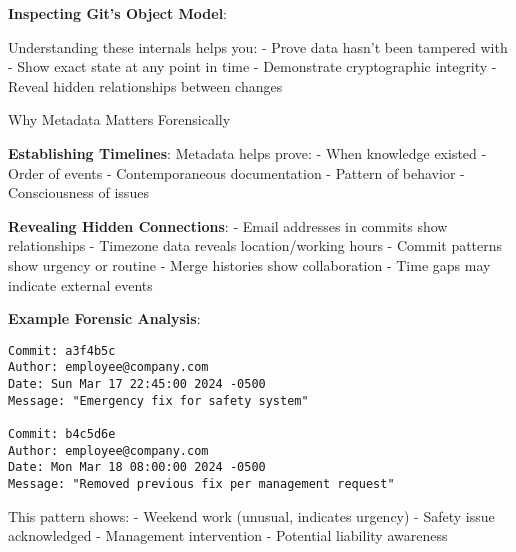 \textbf{Inspecting Git's Object Model}:

\begin{Shaded}
\begin{Highlighting}[]
 \OperatorTok{\textless{}}\OperatorTok{\textgreater{}}

 \OperatorTok{\textless{}}\OperatorTok{\textgreater{}}

\OperatorTok{\textless{}}\OperatorTok{\textgreater{}}

\end{Highlighting}
\end{Shaded}

Understanding these internals helps you: - Prove data hasn't been
tampered with - Show exact state at any point in time - Demonstrate
cryptographic integrity - Reveal hidden relationships between changes

Why Metadata Matters Forensically

\textbf{Establishing Timelines}: Metadata helps prove: - When knowledge
existed - Order of events - Contemporaneous documentation - Pattern of
behavior - Consciousness of issues

\textbf{Revealing Hidden Connections}: - Email addresses in commits show
relationships - Timezone data reveals location/working hours - Commit
patterns show urgency or routine - Merge histories show collaboration -
Time gaps may indicate external events

\textbf{Example Forensic Analysis}:

\begin{verbatim}
Commit: a3f4b5c
Author: employee@company.com
Date: Sun Mar 17 22:45:00 2024 -0500
Message: "Emergency fix for safety system"

Commit: b4c5d6e  
Author: employee@company.com
Date: Mon Mar 18 08:00:00 2024 -0500
Message: "Removed previous fix per management request"
\end{verbatim}

This pattern shows: - Weekend work (unusual, indicates urgency) - Safety
issue acknowledged - Management intervention - Potential liability
awareness

